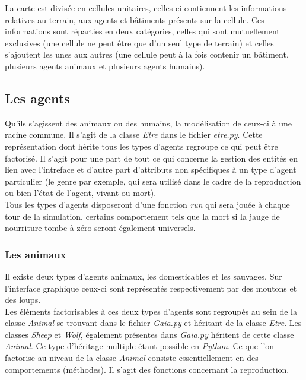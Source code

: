 \documentclass[12pt]{article}
\begin{document}

La carte est divisée en cellules unitaires, celles-ci contiennent les 
informations relatives au terrain, aux agents et bâtiments présents sur la 
cellule. Ces informations sont réparties en deux catégories, celles qui sont 
mutuellement exclusives (une cellule ne peut être que d'un seul type de 
terrain) et celles s'ajoutent les unes aux autres (une cellule peut à la fois 
contenir un bâtiment, plusieurs agents animaux et plusieurs agents humains).

	\subsection{Les agents}

Qu'ils s'agissent des animaux ou des humains, la modélisation de ceux-ci à 
une racine commune. Il s'agit de la classe \textit{Etre} dans le fichier 
\textit{etre.py}. Cette représentation dont hérite tous les types d'agents 
regroupe ce qui peut être factorisé. Il s'agit pour une part de tout ce qui 
concerne la gestion des entités en lien avec l'intreface et d'autre part 
d'attributs non spécifiques à un type d'agent particulier (le genre par 
exemple, qui sera utilisé dans le cadre de la reproduction ou bien l'état de 
l'agent, vivant ou mort).\\

Tous les types d'agents disposeront d'une fonction \textit{run} qui sera jouée 
à chaque tour de la simulation, certains comportement tels que la mort si la 
jauge de nourriture tombe à zéro seront également universels.

		\subsubsection{Les animaux}

Il existe deux types d'agents animaux, les domesticables et les sauvages. Sur 
l'interface graphique ceux-ci sont représentés respectivement par des moutons 
et des loups.\\

Les éléments factorisables à ces deux types d'agents sont 
regroupés au sein de la classe \textit{Animal} se trouvant dans le fichier 
\textit{Gaia.py} et héritant de la classe \textit{Etre}. Les classes 
\textit{Sheep} et \textit{Wolf}, également présentes dans \textit{Gaia.py}
héritent de cette classe \textit{Animal}. Ce type d'héritage multiple étant 
possible en \textit{Python}. Ce que l'on factorise au niveau de la classe 
\textit{Animal} consiste essentiellement en des comportements (méthodes). Il 
s'agit des fonctions concernant la reproduction.\\
\end{document}
